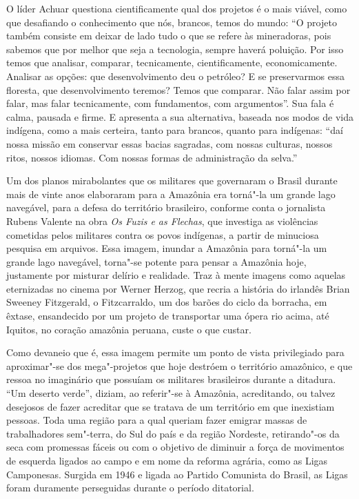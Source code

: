 O líder Achuar questiona cientificamente qual dos projetos é o mais
viável, como que desafiando o conhecimento que nós, brancos, temos do
mundo: ``O projeto também consiste em deixar de lado tudo o que se
refere às mineradoras, pois sabemos que por melhor que seja a
tecnologia, sempre haverá poluição. Por isso temos que analisar,
comparar, tecnicamente, cientificamente, economicamente. Analisar as
opções: que desenvolvimento deu o petróleo? E se preservarmos essa
floresta, que desenvolvimento teremos? Temos que comparar. Não falar
assim por falar, mas falar tecnicamente, com fundamentos, com
argumentos''. Sua fala é calma, pausada e firme. E apresenta a sua
alternativa, baseada nos modos de vida indígena, como a mais certeira,
tanto para brancos, quanto para indígenas: ``daí nossa missão em
conservar essas bacias sagradas, com nossas culturas, nossos ritos,
nossos idiomas. Com nossas formas de administração da selva.''

\asterisc

Um dos planos mirabolantes que os militares que governaram o Brasil
durante mais de vinte anos elaboraram para a Amazônia era torná"-la um
grande lago navegável, para a defesa do território brasileiro, conforme
conta o jornalista Rubens Valente na obra \emph{Os Fuzis e as Flechas},
que investiga as violências cometidas pelos militares contra os povos
indígenas, a partir de minuciosa pesquisa em arquivos. Essa imagem,
inundar a Amazônia para torná"-la um grande lago navegável, torna"-se
potente para pensar a Amazônia hoje, justamente por misturar delírio e
realidade. Traz à mente imagens como aquelas eternizadas no cinema por
Werner Herzog, que recria a história do irlandês Brian Sweeney
Fitzgerald, o Fitzcarraldo, um dos barões do ciclo da borracha, em
êxtase, ensandecido por um projeto de transportar uma ópera rio acima,
até Iquitos, no coração amazônia peruana, custe o que custar.

Como devaneio que é, essa imagem permite um ponto de vista privilegiado
para aproximar"-se dos mega"-projetos que hoje destróem o território
amazônico, e que ressoa no imaginário que possuíam os militares
brasileiros durante a ditadura. ``Um deserto verde'', diziam, ao
referir"-se à Amazônia, acreditando, ou talvez desejosos de fazer
acreditar que se tratava de um território em que inexistiam pessoas.
Toda uma região para a qual queriam fazer emigrar massas de
trabalhadores sem"-terra, do Sul do país e da região Nordeste,
retirando"-os da seca com promessas fáceis ou com o objetivo de diminuir
a força de movimentos de esquerda ligados ao campo e em nome da reforma
agrária, como as Ligas Camponesas. Surgida em 1946 e ligada ao Partido
Comunista do Brasil, as Ligas foram duramente perseguidas durante o
período ditatorial.

